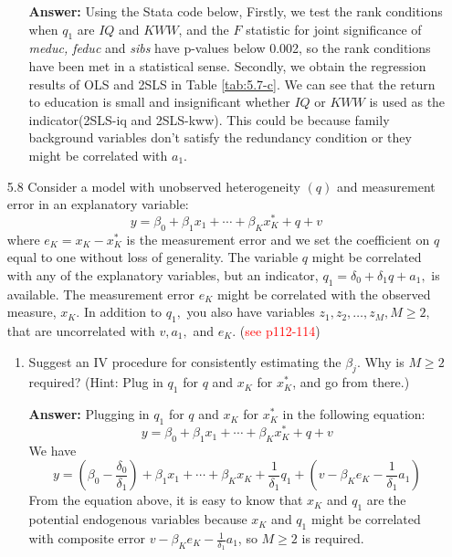 \begin{enumerate}
\begin{enumerate}
        \textbf{Answer:} Using the Stata code below, Firstly, we test the rank conditions when $q_1$ are $IQ$ and $KWW$, and the $F$ statistic for joint significance of \textit{meduc, feduc} and \textit{sibs} have p-values below 0.002, so the rank conditions have been met in a statistical sense. Secondly, we obtain the regression results of OLS and 2SLS in Table \ref{tab:5.7-c}. We can see that the return to education is small and insignificant whether $IQ$ or $KWW$ is used as the indicator(2SLS-iq and 2SLS-kww). This could be because family background variables don't satisfy the redundancy condition or they might be correlated with $a_1$.
        
        
    \end{enumerate}
    
    
    \item[5.8] Consider a model with unobserved heterogeneity $(q)$ and measurement error in an explanatory variable:
    \[ y=\beta_{0}+\beta_{1} x_{1}+\cdots+\beta_{K} x_{K}^{*}+q+v \]
    where $e_{K}=x_{K}-x_{K}^{*}$ is the measurement error and we set the coefficient on $q$ equal to one without loss of generality. The variable $q$ might be correlated with any of the explanatory variables, but an indicator, $q_{1}=\delta_{0}+\delta_{1} q+a_{1},$ is available. The measurement error $e_{K}$ might be correlated with the observed measure, $x_{K} .$ In addition to $q_{1},$ you also have variables $z_{1}, z_{2}, \ldots, z_{M}, M \geq 2,$ that are uncorrelated with $v, a_{1},$ and $e_{K}$. (\textcolor{red}{see p112-114})
    \begin{enumerate}
        \item Suggest an IV procedure for consistently estimating the $\beta_{j} .$ Why is $M \geq 2$ required? (Hint: Plug in $q_{1}$ for $q$ and $x_{K}$ for $x_{K}^{*}$, and go from there.)
        
        \textbf{Answer:} Plugging in $q_1$ for $q$ and $x_K$ for $x_K^*$ in the following equation: 
        \[ y=\beta_{0}+\beta_{1} x_{1}+\cdots+\beta_{K} x_{K}^{*}+q+v \]
        We have
        \[ y=\left(\beta_{0}-\frac{\delta_0}{\delta_1}\right) + \beta_{1} x_{1}+\cdots+\beta_{K} x_{K} + \frac{1}{\delta_1}q_1+\left(v-\beta_K e_K-\frac{1}{\delta_1}a_1\right) \]
        From the equation above, it is easy to know that $x_K$ and $q_1$ are the potential endogenous variables because $x_K$ and $q_1$ might be correlated with composite error $v-\beta_K e_K-\frac{1}{\delta_1}a_1$, so $M\geq 2$ is required.
        

\end{enumerate}
\end{enumerate}
